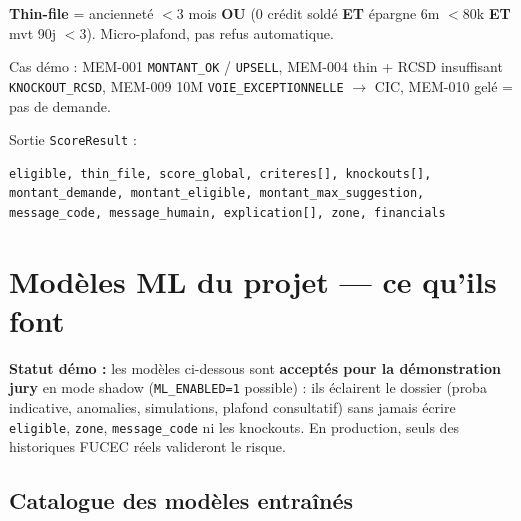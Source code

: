 \documentclass[11pt,a4paper]{article}
\begin{document}
\begin{encadrevert}
\textbf{Thin-file} = ancienneté $<3$ mois \textbf{OU} (0 crédit soldé \textbf{ET} épargne 6m $<80$k \textbf{ET} mvt 90j $<3$). Micro-plafond, pas refus automatique.
\end{encadrevert}

Cas démo : MEM-001 \texttt{MONTANT\_OK} / \texttt{UPSELL}, MEM-004 thin + RCSD insuffisant \texttt{KNOCKOUT\_RCSD}, MEM-009 10M \texttt{VOIE\_EXCEPTIONNELLE} $\rightarrow$ CIC, MEM-010 gelé = pas de demande.

Sortie \texttt{ScoreResult} :
\begin{lstlisting}
eligible, thin_file, score_global, criteres[], knockouts[],
montant_demande, montant_eligible, montant_max_suggestion,
message_code, message_humain, explication[], zone, financials
\end{lstlisting}

\clearpage
\section{Modèles ML du projet --- ce qu'ils font}

\begin{encadrevert}
\textbf{Statut démo :} les modèles ci-dessous sont \textbf{acceptés pour la démonstration jury} en mode shadow (\texttt{ML\_ENABLED=1} possible) : ils éclairent le dossier (proba indicative, anomalies, simulations, plafond consultatif) sans jamais écrire \texttt{eligible}, \texttt{zone}, \texttt{message\_code} ni les knockouts. En production, seuls des historiques FUCEC réels valideront le risque.
\end{encadrevert}

\subsection{Catalogue des modèles entraînés}
\end{document}
